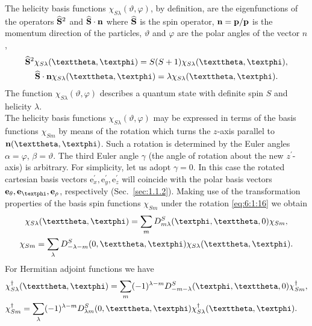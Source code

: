The helicity basis functions $\chi_{S \lambda}(\vartheta, \varphi)$, by definition, are the eigenfunctions of the operators $\widehat{\mathbf{S}}^{2}$ and $\widehat{\mathbf{S}} \cdot \mathbf{n}$ where $\widehat{\mathbf{S}}$ is the spin operator, $\mathbf{n}=\mathbf{p} / \mathbf{p}$ is the momentum direction of the particles, $\vartheta$ and $\varphi$ are the polar angles of the vector $n$,
\begin{gather}
\widehat{\vect{S}}^{2} \chi_{S \lambda}(\vartheta, \varphi)=S(S+1) \chi_{S \lambda}(\vartheta, \varphi), \label{eq:6:1:19}\\
\widehat{\vect{S}} \cdot \vect{n} \chi_{S \lambda}(\vartheta, \varphi)=\lambda \chi_{S \lambda}(\vartheta, \varphi). \notag
\end{gather}
The function $\chi_{S \lambda}(\vartheta, \varphi)$ describes a quantum state with definite spin $S$ and helicity $\lambda$.\\
The helicity basis functions $\chi_{S \lambda}(\vartheta, \varphi)$ may be expressed in terms of the basis functions $\chi_{S m}$ by means of the rotation which turns the $z$-axis parallel to $\vect{n}(\vartheta, \varphi)$. Such a rotation is determined by the Euler angles $\alpha=\varphi$, $\beta=\vartheta$. The third Euler angle $\gamma$ (the angle of rotation about the new $z^{\prime}$-axis) is arbitrary. For simplicity, let us adopt $\gamma=0$. In this case the rotated cartesian basis vectors $\mathrm{e}_{x}^{\prime}, \mathrm{e}_{y}^{\prime}, \mathrm{e}_{z}^{\prime}$ will coincide with the polar basis vectors $\vect{e}_{\theta}, \vect{e}_{\varphi}, \vect{e}_{\rho}$, respectively (Sec.~\ref{sec:1.1.2}). Making use of the transformation properties of the basis spin functions $\chi_{S m}$ under the rotation \eqref{eq:6:1:16} we obtain
\begin{gather}
\chi_{S \lambda}(\vartheta, \varphi)=\sum_{m} D_{m \lambda}^{S}(\varphi, \vartheta, 0) \chi_{S m}, \label{eq:6:1:20}\\
\chi_{S m}=\sum_{\lambda} D_{-\lambda-m}^{S}(0, \vartheta, \varphi) \chi_{S \lambda}(\vartheta, \varphi). \notag
\end{gather}
For Hermitian adjoint functions we have
\begin{align}
& \chi_{S \lambda}^{\dagger}(\vartheta, \varphi)=\sum_{m}(-1)^{\lambda-m} D_{-m-\lambda}^{S}(\varphi, \vartheta, 0) \chi_{S m}^{\dagger}, \notag\\
& \chi_{S m}^{\dagger}=\sum_{\lambda}(-1)^{\lambda-m} D_{\lambda m}^{S}(0, \vartheta, \varphi) \chi_{S \lambda}^{\dagger}(\vartheta, \varphi). \label{eq:6:1:21}
\end{align}
